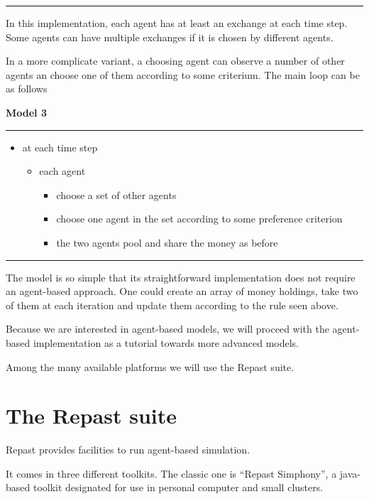 \documentclass{article}
\providecommand{\tightlist}{%
  \setlength{\itemsep}{0pt}\setlength{\parskip}{0pt}}
\begin{document}
\vskip-2mm
\hrule

\vskip4mm

In this implementation, each agent has at least an exchange at each time
step. Some agents can have multiple exchanges if it is chosen by
different agents.

In a more complicate variant, a choosing agent can observe a number of other agents an choose one of them according to some criterium. The main loop can be as follows

\vskip2mm
\noindent\textbf{Model 3}
\vskip1mm
\hrule

\begin{itemize}
\tightlist
\item
  at each time step

  \begin{itemize}
  \tightlist
  \item
    each agent

    \begin{itemize}
    \tightlist
    \item
      choose a set of other agents
    \item
      choose one agent in the set according to some preference criterion
    \item
      the two agents pool and share the money as before
    \end{itemize}
  \end{itemize}
\end{itemize}

\vskip-2mm
\hrule

\vskip4mm

The model is so simple that its straightforward implementation does not require an agent-based approach. One could create an array of money holdings, take two of them at each iteration and update them according to the rule seen above.

Because we are interested in agent-based models, we will proceed with the agent-based implementation as a tutorial towards more advanced models.  

Among the many available platforms we will use the Repast suite.

\section{The Repast suite}

Repast provides facilities to run agent-based simulation.

It comes in three different toolkits. 
The classic one is ``Repast Simphony'', a java-based toolkit designated for use in personal computer and small clusters.  
\end{document}
